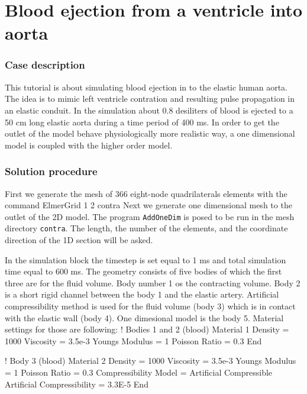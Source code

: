 \chapter{Blood ejection from a ventricle into aorta}


\subsection*{Case description}

This tutorial is about simulating blood ejection in to the elastic human aorta.
The idea is to mimic left ventricle contration and resulting pulse propagation 
in an elastic conduit. In the simulation about 0.8 
desiliters of blood is ejected to a 50 cm long elastic aorta during a time 
period of 400 ms.  In order to get the outlet of the model behave 
physiologically more realistic way, a one dimensional model is coupled
with the higher order model.
 
\subsection*{Solution procedure}

First we generate the mesh of 366 eight-node quadrilaterals elements with 
the command
\ttbegin
ElmerGrid 1 2 contra
\ttend
Next we generate one dimensional mesh to the outlet of the 2D model.
The program {\tt AddOneDim} is posed to be run in the mesh directory
{\tt contra}.  The length, the number of the elements, 
and the coordinate direction of the 1D section will be asked.

In the simulation block the timestep is set equal to 1 ms and 
total simulation time equal to 600 ms.  The geometry consists of five bodies
of which the first three are for the fluid volume.  Body number 1 os the 
contracting volume.  Body 2 is a short rigid channel between the body 1 and 
the elastic artery. Artificial compressibility
method is used for the fluid volume (body 3) which is in contact with the 
elastic wall (body 4).  One dimesional model is the body 5. 
Material settings for those are 
following:
\ttbegin
! Bodies 1 and 2 (blood)
Material 1
  Density = 1000
  Viscosity = 3.5e-3
  Youngs Modulus = 1
  Poisson Ratio = 0.3
End

! Body 3 (blood)
Material 2
  Density = 1000
  Viscosity = 3.5e-3
  Youngs Modulus = 1
  Poisson Ratio = 0.3
  Compressibility Model = Artificial Compressible
  Artificial Compressibility  = 3.3E-5 
End

